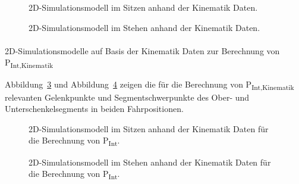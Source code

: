 \documentclass[
  letterpaper,
  DIV=11]{scrartcl}
\makeatletter
\let\oldparagraph\paragraph
\renewcommand{\paragraph}{
    \@ifstar
      \xxxParagraphStar
      \xxxParagraphNoStar
  }
\newcommand{\xxxParagraphStar}[1]{\oldparagraph*{#1}\mbox{}}
\newcommand{\xxxParagraphNoStar}[1]{\oldparagraph{#1}\mbox{}}
\makeatother
\begin{document}
\begin{figure}


\caption{\label{fig-Kinematik_Simulationsmodell_Sitzen}2D-Simulationsmodell
im Sitzen anhand der Kinematik Daten.}

\end{figure}%

\begin{figure}


\caption{\label{fig-Kinematik_Simulationsmodell_Stehen}2D-Simulationsmodell
im Stehen anhand der Kinematik Daten.}

\end{figure}%

\paragraph{\texorpdfstring{2D-Simulationsmodelle auf Basis der Kinematik
Daten zur Berechnung von
P\textsubscript{Int,Kinematik}}{2D-Simulationsmodelle auf Basis der Kinematik Daten zur Berechnung von PInt,Kinematik}}\label{d-simulationsmodelle-auf-basis-der-kinematik-daten-zur-berechnung-von-pintkinematik}

Abbildung~\ref{fig-Kinematik_Simulationsmodell_Sitzen_PInt} und
Abbildung~\ref{fig-Kinematik_Simulationsmodell_Stehen_PInt} zeigen die
für die Berechnung von P\textsubscript{Int,Kinematik} relevanten
Gelenkpunkte und Segmentschwerpunkte des Ober- und Unterschenkelsegments
in beiden Fahrpositionen.

\begin{figure}


\caption{\label{fig-Kinematik_Simulationsmodell_Sitzen_PInt}2D-Simulationsmodell
im Sitzen anhand der Kinematik Daten für die Berechnung von
P\textsubscript{Int}.}

\end{figure}%

\begin{figure}


\caption{\label{fig-Kinematik_Simulationsmodell_Stehen_PInt}2D-Simulationsmodell
im Stehen anhand der Kinematik Daten für die Berechnung von
P\textsubscript{Int}.}

\end{figure}%
\end{document}
